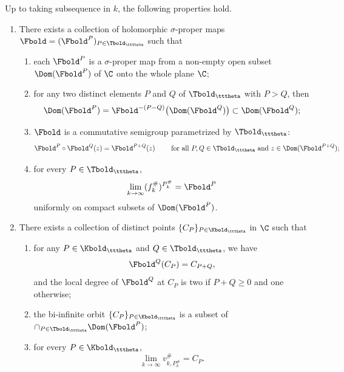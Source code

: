 \documentclass{amsart}
\begin{document}
\begin{theorem}
\label{thm:transcendental-extension}
    Up to taking subsequence in $k$, the following properties hold.
    \begin{enumerate}
        \item There exists a collection of holomorphic $\sigma$-proper maps $\Fbold = (\Fbold^P)_{P \in \Tbold_{\tttheta}}$ such that
        \begin{enumerate}[label=\textnormal{(\alph*)}]
            \item each $\Fbold^P$ is a $\sigma$-proper map from a non-empty open subset $\Dom(\Fbold^P)$ of $\C$ onto the whole plane $\C$;
            \item for any two distinct elements $P$ and $Q$ of $\Tbold_{\tttheta}$ with $P > Q$, then 
            \[
                \Dom(\Fbold^P) = \Fbold^{-(P-Q)} \big( \Dom(\Fbold^Q) \big) \subset \Dom(\Fbold^Q);
            \]
            \item $\Fbold$ is a commutative semigroup parametrized by $\Tbold_{\tttheta}$:
            \begin{equation}
            \label{eq:thm:transcendental-extension}
                 \Fbold^P \circ \Fbold^Q(z) = \Fbold^{P+Q}(z) \qquad \text{ for all } P, Q \in \Tbold_{\tttheta} \text{ and } z \in \Dom(\Fbold^{P+Q});
            \end{equation}
            \item for every $P \in \Tbold_{\tttheta}$, 
            \[
                \lim_{k \to \infty}
                (f_k^{\#})^{P_k^{\#}}
                = \Fbold^P
            \]
            uniformly on compact subsets of $\Dom(\Fbold^{P})$.
        \end{enumerate}
        \item There exists a collection of distinct points $\{C_P \}_{P \in \Kbold_{\tttheta}}$ in $\C$ such that
        \begin{enumerate}[label=\textnormal{(\alph*)}]
            \item for any $P \in \Kbold_{\tttheta}$ and $Q \in \Tbold_{\tttheta}$, we have 
            \[
            \Fbold^Q(C_P) = C_{P+Q},
            \]
            and the local degree of $\Fbold^Q$ at $C_P$ is two if $P+Q \geq 0$ and one otherwise;
            \item the bi-infinite orbit $\{C_P\}_{P \in \Kbold_{\tttheta}}$ is a subset of $\cap_{P \in \Tbold_{\tttheta}} \Dom(\Fbold^P)$;
            \item for every $P \in \Kbold_{\tttheta}$, 
            \[
                \lim_{k \to \infty} v^{\#}_{k, P_k^{\#}} = C_{P}.
            \]
        \end{enumerate}
    \end{enumerate}
\end{theorem}
\end{document}
